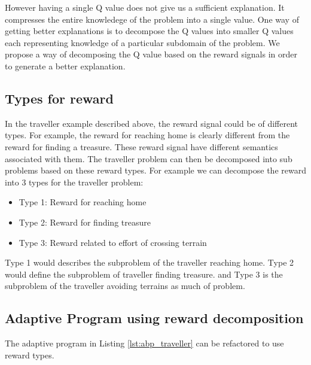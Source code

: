 \documentclass[conference]{IEEEtran}
\begin{document}
However having a single Q value does not give us a sufficient explanation. It compresses the entire knowledege
of the problem into a single value. One way of getting better explanations is to decompose the Q values into
smaller Q values each representing knowledge of a particular subdomain of the problem. We propose a way of decomposing
the Q value based on the reward signals in order to generate a better explanation.

\subsection{Types for reward}

In the traveller example described above, the reward signal could be of different types. For example, the reward
for reaching home is clearly different from the reward for finding a treasure. These reward signal have different
semantics associated with them. The traveller problem can then be decomposed into sub problems based on these reward
types. For example we can decompose the reward into 3 types for the traveller problem:
\begin{itemize}
  \item Type 1: Reward for reaching home
  \item Type 2: Reward for finding treasure
  \item Type 3: Reward related to effort of crossing terrain
\end{itemize}

Type 1 would describes the subproblem of the traveller reaching home. Type 2 would define the subproblem of traveller finding treasure.
and Type 3 is the subproblem of the traveller avoiding terrains as much of problem.

\subsection{Adaptive Program using reward decomposition}

The adaptive program in Listing \ref{lst:abp_traveller} can be refactored to use reward types.
\end{document}
